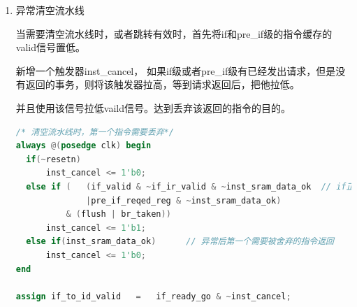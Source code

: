 \documentclass[11pt]{article}
\begin{document}
\begin{enumerate}
\item 异常清空流水线

当需要清空流水线时，或者跳转有效时，首先将if和pre\_if级的指令缓存的valid信号置低。

新增一个触发器inst\_cancel，
如果if级或者pre\_if级有已经发出请求，但是没有返回的事务，则将该触发器拉高，等到请求返回后，把他拉低。

并且使用该信号拉低vaild信号。达到丢弃该返回的指令的目的。
\begin{lstlisting}[language=verilog]
  /* 清空流水线时，第一个指令需要丢弃*/
always @(posedge clk) begin
  if(~resetn)
      inst_cancel <= 1'b0;
  else if (   (if_valid & ~if_ir_valid & ~inst_sram_data_ok  // if正在等待指令返回
              |pre_if_reqed_reg & ~inst_sram_data_ok)
          & (flush | br_taken))
      inst_cancel <= 1'b1;
  else if(inst_sram_data_ok)      // 异常后第一个需要被舍弃的指令返回
      inst_cancel <= 1'b0;
end

assign if_to_id_valid   =   if_ready_go & ~inst_cancel;
\end{lstlisting}
\end{enumerate}
\end{document}
